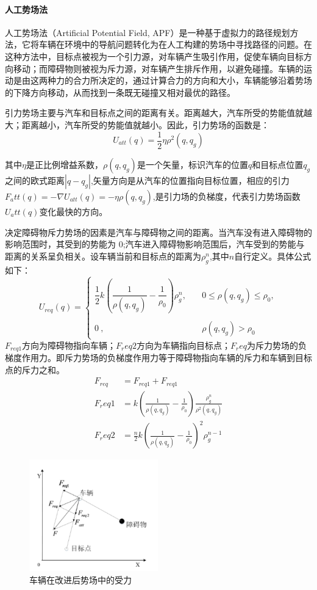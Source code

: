 \documentclass{report}
\begin{document}
\paragraph{人工势场法\cite{jh6}}
人工势场法（Artificial Potential Field, APF）是一种基于虚拟力的路径规划方法，它将车辆在环境中的导航问题转化为在人工构建的势场中寻找路径的问题。在这种方法中，目标点被视为一个引力源，对车辆产生吸引作用，促使车辆向目标方向移动；而障碍物则被视为斥力源，对车辆产生排斥作用，以避免碰撞。车辆的运动是由这两种力的合力所决定的，通过计算合力的方向和大小，车辆能够沿着势场的下降方向移动，从而找到一条既无碰撞又相对最优的路径。

引力势场主要与汽车和目标点之间的距离有关。距离越大，汽车所受的势能值就越大；距离越小，汽车所受的势能值就越小。因此，引力势场的函数是：
$$U_{att}(q)=\frac12\eta\rho^2(q,q_g)$$

其中$\eta$是正比例增益系数，$\rho(q,q_g)$是一个矢量，标识汽车的位置$q$和目标点位置$q_g$之间的欧式距离$|q-q_g|$,矢量方向是从汽车的位置指向目标位置，相应的引力$F_att(q)=-\nabla U_{att}(q)=-\eta\rho(q,q_g)$,是引力场的负梯度，代表引力势场函数$U_att(q)$变化最快的方向。

决定障碍物斥力势场的因素是汽车与障碍物之间的距离。当汽车没有进入障碍物的影响范围时，其受到的势能为 0;汽车进入障碍物影响范围后，汽车受到的势能与距离的关系呈负相关。设车辆当前和目标点的距离为$\rho_g^n$,其中$n$自行定义。具体公式如下：
$$U_{req}(q)=\begin{cases}\dfrac{1}{2}k\left(\dfrac{1}{\rho(q,q_g)}-\dfrac{1}{\rho_0}\right)\rho_g^n,&\quad0\leq\rho(q,q_g)\leq\rho_0,\\\\0\:,&\quad\rho(q,q_g)>\rho_0\end{cases}$$
$F_{req1}$方向为障碍物指向车辆；$F_req2$方向为车辆指向目标点；$F_req$为斥力势场的负梯度作用力。即斥力势场的负梯度作用力等于障碍物指向车辆的斥力和车辆到目标点的斥力之和。
\begin{align}
  \label{}
F_{req}&=F_{req1}+F_{req1}\\
F_req1&=k\left(\frac1{\rho(q,q_g)}-\frac1{\rho_0}\right)\frac{\rho_g^n}{\rho^2(q,q_g)}\\
F_req2&=\frac n2k\left(\frac1{\rho(q,q_g)}-\frac1{\rho_0}\right)^2\rho_g^{n-1}
\end{align}
\begin{figure}[ht]
  \centering
  \includegraphics[width=0.5\textwidth]{figures/APF.png}
  \caption{车辆在改进后势场中的受力}
\end{figure}
\end{document}
